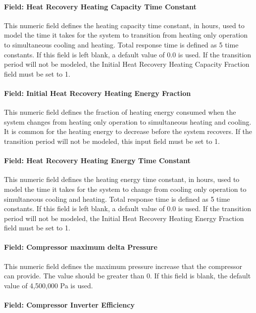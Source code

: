 \paragraph{Field: Heat Recovery Heating Capacity Time Constant}

This numeric field defines the heating capacity time constant, in hours, used to model the time it takes for the system to transition from heating only operation to simultaneous cooling and heating. Total response time is defined as 5 time constants. If this field is left blank, a default value of 0.0 is used. If the transition period will not be modeled, the Initial Heat Recovery Heating Capacity Fraction field must be set to 1.

\paragraph{Field: Initial Heat Recovery Heating Energy Fraction}

This numeric field defines the fraction of heating energy consumed when the system changes from heating only operation to simultaneous heating and cooling. It is common for the heating energy to decrease before the system recovers. If the transition period will not be modeled, this input field must be set to 1.

\paragraph{Field: Heat Recovery Heating Energy Time Constant}

This numeric field defines the heating energy time constant, in hours, used to model the time it takes for the system to change from cooling only operation to simultaneous cooling and heating. Total response time is defined as 5 time constants. If this field is left blank, a default value of 0.0 is used. If the transition period will not be modeled, the Initial Heat Recovery Heating Energy Fraction field must be set to 1.

\paragraph{Field: Compressor maximum delta Pressure}

This numeric field defines the maximum pressure increase that the compressor can provide. The value should be greater than 0. If this field is blank, the default value of 4,500,000 Pa is used.

\paragraph{Field: Compressor Inverter Efficiency}

